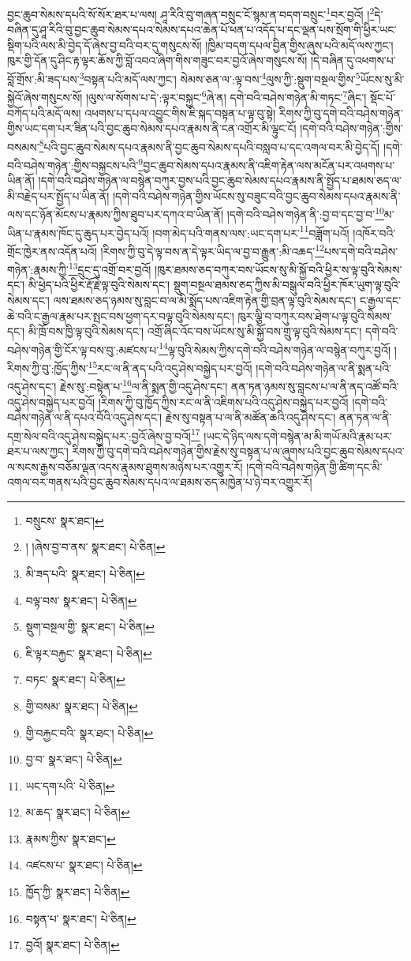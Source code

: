 བྱང་ཆུབ་སེམས་དཔའི་སོ་སོར་ཐར་པ་ལས། ཤཱ་རིའི་བུ་གཞན་བསྲུང་ངོ་སྙམ་ན་བདག་བསྲུང་\footnote{བསྲུངས་  སྣར་ཐང་། }བར་བྱའོ། །\footnote{། །ཞེས་བྱ་བ་ནས་  སྣར་ཐང་།  པེ་ཅིན། }དེ་བཞིན་དུ་ཤཱ་རིའི་བུ་བྱང་ཆུབ་སེམས་དཔའ་སེམས་དཔའ་ཆེན་པོ་ཕན་པ་འདོད་པ་དང་ལྡན་པས་སྲོག་གི་ཕྱིར་ཡང་སྡིག་པའི་ལས་མི་བྱེད་དོ་ཞེས་བྱ་བའི་བར་དུ་གསུངས་སོ། །ཁྱིམ་བདག་དཔལ་བྱིན་གྱིས་ཞུས་པའི་མདོ་ལས་ཀྱང་། ཁུར་གྱི་དོན་དུ་ཤིང་རྟ་ལྟར་ཆོས་ཀྱི་བློ་འབའ་ཞིག་གིས་གཟུང་བར་བྱའོ་ཞེས་གསུངས་སོ། །དེ་བཞིན་དུ་འཕགས་པ་བློ་གྲོས་:མི་ཟད་པས་\footnote{མི་ཟད་པའི་  སྣར་ཐང་།  པེ་ཅིན། }བསྟན་པའི་མདོ་ལས་ཀྱང་། སེམས་ཅན་ལ་:ལྟ་བས་\footnote{བལྟ་བས་  སྣར་ཐང་།  པེ་ཅིན། }ལུས་ཀྱི་:སྡུག་བསྔལ་གྱིས་\footnote{སྡུག་བསྔལ་གྱི་  སྣར་ཐང་།  པེ་ཅིན། }ཡོངས་སུ་མི་སྐྱེའོ་ཞེས་གསུངས་སོ། །ལུས་ལ་སོགས་པ་དེ་:ལྟར་བསྐྱང་\footnote{ཇི་ལྟར་བརྐྱང་  སྣར་ཐང་།  པེ་ཅིན། }ཞེ་ན། དགེ་བའི་བཤེས་གཉེན་མི་གཏང་\footnote{བཏང་  སྣར་ཐང་།  པེ་ཅིན། }ཞིང་། སྡོང་པོ་བཀོད་པའི་མདོ་ལས། འཕགས་པ་དཔལ་འབྱུང་གིས་ཇི་སྐད་བསྟན་པ་ལྟ་བུ་སྟེ། རིགས་ཀྱི་བུ་དགེ་བའི་བཤེས་གཉེན་གྱིས་ཡང་དག་པར་ཟིན་པའི་བྱང་ཆུབ་སེམས་དཔའ་རྣམས་ནི་ངན་འགྲོར་མི་ལྟུང་ངོ། །དགེ་བའི་བཤེས་གཉེན་:གྱིས་བསམས་\footnote{གྱི་བསམ་  སྣར་ཐང་།  པེ་ཅིན། }པའི་བྱང་ཆུབ་སེམས་དཔའ་རྣམས་ནི་བྱང་ཆུབ་སེམས་དཔའི་བསླབ་པ་དང་འགལ་བར་མི་བྱེད་དོ། །དགེ་བའི་བཤེས་གཉེན་:གྱིས་བསྐྱངས་པའི་\footnote{གྱི་བརྐྱང་བའི་  སྣར་ཐང་།  པེ་ཅིན། }བྱང་ཆུབ་སེམས་དཔའ་རྣམས་ནི་འཇིག་རྟེན་ལས་མངོན་པར་འཕགས་པ་ཡིན་ནོ། །དགེ་བའི་བཤེས་གཉེན་ལ་བསྙེན་བཀུར་བྱས་པའི་བྱང་ཆུབ་སེམས་དཔའ་རྣམས་ནི་སྤྱོད་པ་ཐམས་ཅད་ལ་མི་བརྗེད་པར་སྤྱོད་པ་ཡིན་ནོ། །དགེ་བའི་བཤེས་གཉེན་གྱིས་ཡོངས་སུ་བཟུང་བའི་བྱང་ཆུབ་སེམས་དཔའ་རྣམས་ནི་ལས་དང་ཉོན་མོངས་པ་རྣམས་ཀྱིས་ཐུབ་པར་དཀའ་བ་ཡིན་ནོ། །དགེ་བའི་བཤེས་གཉེན་ནི་:བྱ་བ་དང་བྱ་བ་\footnote{བྱ་བ་  སྣར་ཐང་།  པེ་ཅིན། }མ་ཡིན་པ་རྣམས་ཁོང་དུ་ཆུད་པར་བྱེད་པའོ། །བག་མེད་པའི་གནས་ལས་:ཡང་དག་པར་\footnote{ཡང་དག་པའི་  པེ་ཅིན། }བཟློག་པའོ། །འཁོར་བའི་གྲོང་ཁྱེར་ནས་འདོན་པའོ། །རིགས་ཀྱི་བུ་དེ་ལྟ་བས་ན་དེ་ལྟར་ཡིད་ལ་བྱ་བ་རྒྱུན་:མི་འཆད་\footnote{མ་ཆད་  སྣར་ཐང་།  པེ་ཅིན། }པས་དགེ་བའི་བཤེས་གཉེན་:རྣམས་ཀྱི་\footnote{རྣམས་ཀྱིས་  སྣར་ཐང་། }དྲུང་དུ་འགྲོ་བར་བྱའོ། །ཁུར་ཐམས་ཅད་བཀུར་བས་ཡོངས་སུ་མི་སྐྱོ་བའི་ཕྱིར་ས་ལྟ་བུའི་སེམས་དང་། མི་ཕྱེད་པའི་ཕྱིར་རྡོ་རྗེ་ལྟ་བུའི་སེམས་དང་། སྡུག་བསྔལ་ཐམས་ཅད་ཀྱིས་མི་བསྒུལ་བའི་ཕྱིར་ཁོར་ཡུག་ལྟ་བུའི་སེམས་དང་། ལས་ཐམས་ཅད་ཉམས་སུ་བླང་བ་ལ་མི་སྨོད་པས་འཇིག་རྟེན་གྱི་བྲན་ལྟ་བུའི་སེམས་དང་། ང་རྒྱལ་དང་ཆེ་བའི་ང་རྒྱལ་རྣམ་པར་སྤང་བས་ཕྱག་དར་བལྟ་བུའི་སེམས་དང་། ཁུར་ལྕི་བ་བཀུར་བས་ཐེག་པ་ལྟ་བུའི་སེམས་དང་། མི་ཁྲོ་བས་ཁྱི་ལྟ་བུའི་སེམས་དང་། འགྲོ་ཞིང་འོང་བས་ཡོངས་སུ་མི་སྐྱོ་བས་གྲུ་ལྟ་བུའི་སེམས་དང་། དགེ་བའི་བཤེས་གཉེན་གྱི་ངོར་ལྟ་བས་བུ་:མཛངས་པ་\footnote{འཛངས་པ་  སྣར་ཐང་།  པེ་ཅིན། }ལྟ་བུའི་སེམས་ཀྱིས་དགེ་བའི་བཤེས་གཉེན་ལ་བསྙེན་བཀུར་བྱའོ། །རིགས་ཀྱི་བུ་:ཁྱོད་ཀྱིས་\footnote{ཁྱོད་ཀྱི་  སྣར་ཐང་།  པེ་ཅིན། }རང་ལ་ནི་ནད་པའི་འདུ་ཤེས་བསྐྱེད་པར་བྱའོ། །དགེ་བའི་བཤེས་གཉེན་ལ་ནི་སྨན་པའི་འདུ་ཤེས་དང་། རྗེས་སུ་:བསྟེན་པ་\footnote{བསྟན་པ་  སྣར་ཐང་།  པེ་ཅིན། }ལ་ནི་སྨན་གྱི་འདུ་ཤེས་དང་། ནན་ཏན་ཉམས་སུ་བླངས་པ་ལ་ནི་ནད་འཚོ་བའི་འདུ་ཤེས་བསྐྱེད་པར་བྱའོ། །རིགས་ཀྱི་བུ་ཁྱོད་ཀྱིས་རང་ལ་ནི་འཇིགས་པའི་འདུ་ཤེས་བསྐྱེད་པར་བྱའོ། །དགེ་བའི་བཤེས་གཉེན་ལ་ནི་དཔའ་བོའི་འདུ་ཤེས་དང་། རྗེས་སུ་བསྟན་པ་ལ་ནི་མཚོན་ཆའི་འདུ་ཤེས་དང་། ནན་ཏན་ལ་ནི་དགྲ་སེལ་བའི་འདུ་ཤེས་བསྐྱེད་པར་:བྱའོ་ཞེས་བྱ་བའོ།\footnote{བྱའོ།  སྣར་ཐང་།  པེ་ཅིན། } །ཡང་དེ་ཉིད་ལས་དགེ་བསྙེན་མ་མི་གཡོ་མའི་རྣམ་པར་ཐར་པ་ལས་ཀྱང་། རིགས་ཀྱི་བུ་དགེ་བའི་བཤེས་གཉེན་གྱིས་རྗེས་སུ་བསྟན་པ་ལ་ཞུགས་པའི་བྱང་ཆུབ་སེམས་དཔའ་ལ་སངས་རྒྱས་བཅོམ་ལྡན་འདས་རྣམས་ཐུགས་མཉེས་པར་འགྱུར་རོ། །དགེ་བའི་བཤེས་གཉེན་གྱི་ཚིག་དང་མི་འགལ་བར་གནས་པའི་བྱང་ཆུབ་སེམས་དཔའ་ལ་ཐམས་ཅད་མཁྱེན་པ་ཉེ་བར་འགྱུར་རོ། 